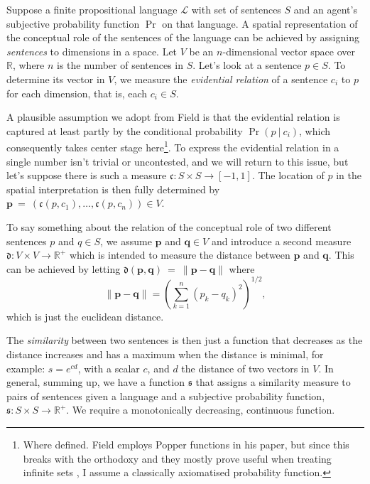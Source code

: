 \documentclass[11pt, a4paper]{article}
\renewcommand{\i}[1]{\emph{#1}}
\newcommand{\given}[1][]{\:#1\vert\:}
\begin{document}
Suppose a finite propositional language $\mathcal{L}$ with set of sentences $S$ and an agent's subjective probability function $\Pr$ on that language. A spatial representation of the conceptual role of the sentences of the language can be achieved by assigning \i{sentences} to dimensions in a space. Let $V$ be an $n$-dimensional vector space over $\mathbb{R}$, where $n$ is the number of sentences in $S$. Let's look at a sentence $p \in S$. To determine its vector in $V$, we measure the \i{evidential relation} of a sentence $c_i$ to $p$ for each dimension, that is, each $c_i \in S$. 

A plausible assumption we adopt from Field is that the evidential relation is captured at least partly by the conditional probability $\Pr(p \given c_i)$, which consequently takes center stage here\footnote{Where defined. Field employs Popper functions in his paper, but since this breaks with the orthodoxy and they mostly prove useful when treating infinite sets \parencite[1352]{Leitgeb2013-LEIRBS}, I assume a classically axiomatised probability function.}. To express the evidential relation in a single number isn't trivial or uncontested, and we will return to this issue, but let's suppose there is such a measure $\mathfrak{c}: S \times S \rightarrow \left[-1,1\right]$. The location of $p$ in the spatial interpretation is then fully determined by $\mathbf{p}~=~(\mathfrak{c}({p, c_1}),\dots, \mathfrak{c}(p, c_n)) \in V$.

To say something about the relation of the conceptual role of two different sentences $p$ and $q \in S$, we assume $\mathbf{p}$ and $\mathbf{q} \in V$ and introduce a second measure $\mathfrak{d}: V \times V \rightarrow \mathbb{R}^+$ which is intended to measure the distance between $\mathbf{p}$ and $\mathbf{q}$. This can be achieved by letting $\mathfrak{d}(\mathbf{p}, \mathbf{q})~=~\lVert \mathbf{p} - \mathbf{q} \rVert$ where 
\[
    \lVert \mathbf{p}-\mathbf{q} \rVert = {\left( \sum_{k=1}^n {(p_k-q_k)}^2 \right)}^{1/2}, 
\]
which is just the euclidean distance. 

The \i{similarity} between two sentences is then just a function that decreases as the distance increases and has a maximum when the distance is minimal, for example: $s = e^{cd}$, with a scalar $c$, and $d$ the distance of two vectors in $V$. In general, summing up, we have a function $\mathfrak{s}$ that assigns a similarity measure to pairs of sentences given a language and a subjective probability function, $\mathfrak{s}: S \times S \rightarrow \mathbb{R}^+$. We require a monotonically decreasing, continuous function. 
\end{document}
